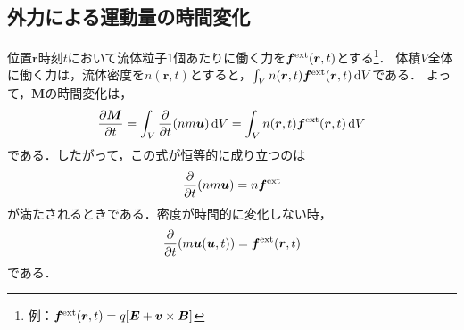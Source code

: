 \documentclass{report}
\begin{document}
    \subsection{外力による運動量の時間変化}
      位置$\bm{r}$時刻$t$において流体粒子1個あたりに働く力を$\bm{f}^{\mathrm{ext}}(\bm{r},t)$とする\footnote{例：$\bm{f}^{\mathrm{ext}}(\bm{r},t) = q\qty[\bm{E} + \bm{v} \times \bm{B}]$}．
      体積$V$全体に働く力は，流体密度を$n(\bm{r},t)$とすると，$\int_V n(\bm{r},t) \bm{f}^{\mathrm{ext}}(\bm{r},t) \dd{V}$である．
      よって，$\bm{M}$の時間変化は，
      \begin{align}
        \pdv{\bm{M}}{t} = \int_V \pdv{t}(n m \bm{u}) \dd{V} = \int_V n(\bm{r},t) \bm{f}^{\mathrm{ext}}(\bm{r},t) \dd{V}
      \end{align}
      である．したがって，この式が恒等的に成り立つのは
      \begin{align}
        \pdv{t}(n m \bm{u}) = n \bm{f}^{\mathrm{ext}}
      \end{align}
      が満たされるときである．密度が時間的に変化しない時，
      \begin{align}
        \pdv{t}(m \bm{u}(\bm{u},t)) = \bm{f}^{\mathrm{ext}}(\bm{r},t)
      \end{align}
      である．
\end{document}
